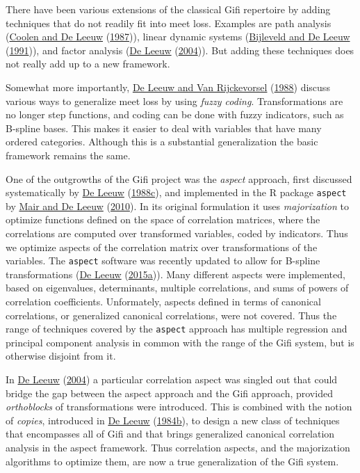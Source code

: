 \documentclass[
  12pt,
]{book}
\begin{document}
There have been various extensions of the classical Gifi repertoire by adding
techniques that do not readily fit into meet loss. Examples are path analysis (\protect\hyperlink{ref-coolen_deleeuw_R_87}{Coolen and De Leeuw} (\protect\hyperlink{ref-coolen_deleeuw_R_87}{1987})), linear dynamic systems (\protect\hyperlink{ref-bijleveld_deleeuw_A_91}{Bijleveld and De Leeuw} (\protect\hyperlink{ref-bijleveld_deleeuw_A_91}{1991})), and factor analysis (\protect\hyperlink{ref-deleeuw_C_04a}{De Leeuw} (\protect\hyperlink{ref-deleeuw_C_04a}{2004})). But adding these techniques does not really add up to a new framework.

Somewhat more importantly, \protect\hyperlink{ref-deleeuw_vanrijckevorsel_C_88}{De Leeuw and Van Rijckevorsel} (\protect\hyperlink{ref-deleeuw_vanrijckevorsel_C_88}{1988}) discuss various ways to generalize meet loss by using \emph{fuzzy coding}. Transformations are no longer step functions, and coding can be done with fuzzy indicators, such as B-spline bases.
This makes it easier to deal with variables that have many ordered categories. Although this is a substantial generalization the basic framework remains the same.

One of the outgrowths of the Gifi project was the \emph{aspect} approach, first discussed systematically by \protect\hyperlink{ref-deleeuw_C_88b}{De Leeuw} (\protect\hyperlink{ref-deleeuw_C_88b}{1988c}), and implemented in the R package
\texttt{aspect} by \protect\hyperlink{ref-mair_deleeuw_A_10}{Mair and De Leeuw} (\protect\hyperlink{ref-mair_deleeuw_A_10}{2010}). In its original formulation it uses \emph{majorization} to optimize functions defined on the space of correlation matrices, where the correlations are computed over transformed variables, coded by indicators. Thus we optimize aspects of the correlation matrix over transformations of the variables. The \texttt{aspect} software was recently updated to allow for B-spline transformations (\protect\hyperlink{ref-deleeuw_E_15b}{De Leeuw} (\protect\hyperlink{ref-deleeuw_E_15b}{2015a})). Many different aspects were implemented, based on eigenvalues, determinants, multiple correlations, and sums of powers of correlation coefficients. Unformately, aspects defined in terms of canonical correlations, or generalized canonical correlations, were not covered. Thus the range of techniques covered by the \texttt{aspect} approach has multiple regression and principal component analysis in common with the range of the Gifi system, but is otherwise disjoint from it.

In \protect\hyperlink{ref-deleeuw_C_04a}{De Leeuw} (\protect\hyperlink{ref-deleeuw_C_04a}{2004}) a particular correlation aspect was singled out that could bridge the gap between the aspect approach and the Gifi approach, provided \emph{orthoblocks} of transformations were introduced. This is combined with the notion of \emph{copies}, introduced in \protect\hyperlink{ref-deleeuw_C_84c}{De Leeuw} (\protect\hyperlink{ref-deleeuw_C_84c}{1984b}), to design a new class of techniques that encompasses all of Gifi and that brings generalized canonical correlation analysis in the aspect framework. Thus correlation aspects, and the majorization algorithms to optimize them, are now a true generalization of the Gifi system.
\end{document}
